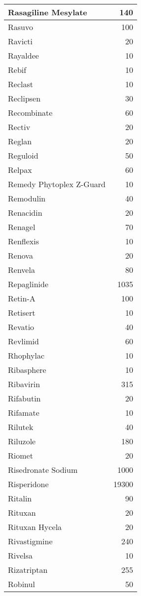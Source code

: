 \documentclass[
]{article}
\begin{document}
\begin{table}
\begin{tabular}[t]{l|r}
\hline
Rasagiline Mesylate & 140\\
\hline
Rasuvo & 100\\
\hline
Ravicti & 20\\
\hline
Rayaldee & 10\\
\hline
Rebif & 10\\
\hline
Reclast & 10\\
\hline
Reclipsen & 30\\
\hline
Recombinate & 60\\
\hline
Rectiv & 20\\
\hline
Reglan & 20\\
\hline
Reguloid & 50\\
\hline
Relpax & 60\\
\hline
Remedy Phytoplex Z-Guard & 10\\
\hline
Remodulin & 40\\
\hline
Renacidin & 20\\
\hline
Renagel & 70\\
\hline
Renflexis & 10\\
\hline
Renova & 20\\
\hline
Renvela & 80\\
\hline
Repaglinide & 1035\\
\hline
Retin-A & 100\\
\hline
Retisert & 10\\
\hline
Revatio & 40\\
\hline
Revlimid & 60\\
\hline
Rhophylac & 10\\
\hline
Ribasphere & 10\\
\hline
Ribavirin & 315\\
\hline
Rifabutin & 20\\
\hline
Rifamate & 10\\
\hline
Rilutek & 40\\
\hline
Riluzole & 180\\
\hline
Riomet & 20\\
\hline
Risedronate Sodium & 1000\\
\hline
Risperidone & 19300\\
\hline
Ritalin & 90\\
\hline
Rituxan & 20\\
\hline
Rituxan Hycela & 20\\
\hline
Rivastigmine & 240\\
\hline
Rivelsa & 10\\
\hline
Rizatriptan & 255\\
\hline
Robinul & 50\\

\end{tabular}
\end{table}
\end{document}
